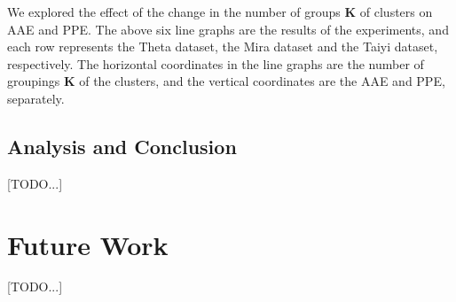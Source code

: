 \documentclass[conference,compsoc]{IEEEtran}
\begin{document}
We explored the effect of the change in the number of groups \textbf{K} of clusters on AAE and PPE. The above six line graphs are the results of the experiments, and each row represents the Theta dataset, the Mira dataset and the Taiyi dataset, respectively. The horizontal coordinates in the line graphs are the number of groupings \textbf{K} of the clusters, and the vertical coordinates are the AAE and PPE, separately.


\subsection{Analysis and Conclusion}
[TODO...]

\section{Future Work}
[TODO...]











%
%



\end{document}
